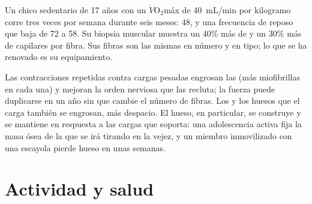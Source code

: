 \begin{example}\label{ex:g10:sport-and-health:numbers}
Un chico sedentario de 17 años con un $\dot V\!\mathrm{O_2}$máx de
\qty{40}{mL/min} por kilogramo corre tres veces por semana durante seis
meses: \num{48}, y una frecuencia de reposo que baja de 72 a 58. Su
biopsia muscular muestra un 40\% más de  y un 30\% más de
capilares por fibra. Sus fibras son las mismas en número y en tipo; lo
que se ha renovado es su equipamiento.
\end{example}

\begin{proposition}\label{prop:g10:sport-and-health:strength}
Las contracciones repetidas contra cargas pesadas engrosan las  (más miofibrillas en cada una) y mejoran la orden nerviosa
que las recluta; la fuerza puede duplicarse en un año sin que cambie el
número de fibras. Los  y los huesos que el  carga
también se engrosan, más despacio. El hueso, en particular, se
construye y se mantiene en respuesta a las cargas que soporta: una
adolescencia activa fija la masa ósea de la que se irá tirando en la
vejez, y un miembro inmovilizado con una escayola pierde hueso en unas
semanas.
\end{proposition}
\admitted

\section{Actividad y salud}

